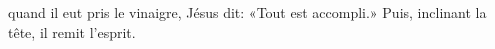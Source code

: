 \encetemps quand il eut pris le vinaigre,
	Jésus dit: «Tout est accompli.»
Puis, inclinant la tête, il remit l’esprit.
